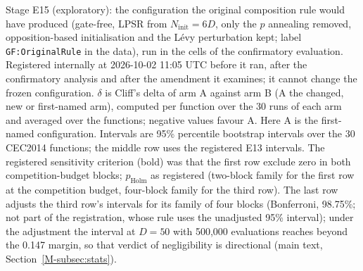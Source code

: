 \begin{table}[htbp]
\centering
\caption{Sensitivity of the confirmatory result to the composition-rule amendment (stage E15).}
\label{tab:supp_e15}
\begin{flushleft}\footnotesize
Stage E15 (exploratory): the configuration the original composition rule would have produced (gate-free, LPSR from $N_{\text{init}}=6D$, only the $p$ annealing removed, opposition-based initialisation and the L\'evy perturbation kept; label \texttt{GF:OriginalRule} in the data), run in the cells of the confirmatory evaluation. Registered internally at 2026-10-02 11:05 UTC before it ran, after the confirmatory analysis and after the amendment it examines; it cannot change the frozen configuration. $\delta$ is Cliff's delta of arm A against arm B (A the changed, new or first-named arm), computed per function over the 30 runs of each arm and averaged over the functions; negative values favour A. Here A is the first-named configuration. Intervals are 95\% percentile bootstrap intervals over the 30 CEC2014 functions; the middle row uses the registered E13 intervals. The registered sensitivity criterion (bold) was that the first row exclude zero in both competition-budget blocks; $p_{\text{Holm}}$ as registered (two-block family for the first row at the competition budget, four-block family for the third row). The last row adjusts the third row's intervals for its family of four blocks (Bonferroni, 98.75\%; not part of the registration, whose rule uses the unadjusted 95\% interval); under the adjustment the interval at $D=50$ with 500{,}000 evaluations reaches beyond the 0.147 margin, so that verdict of negligibility is directional (main text, Section~\ref{M-subsec:stats}).
\end{flushleft}
\end{table}
